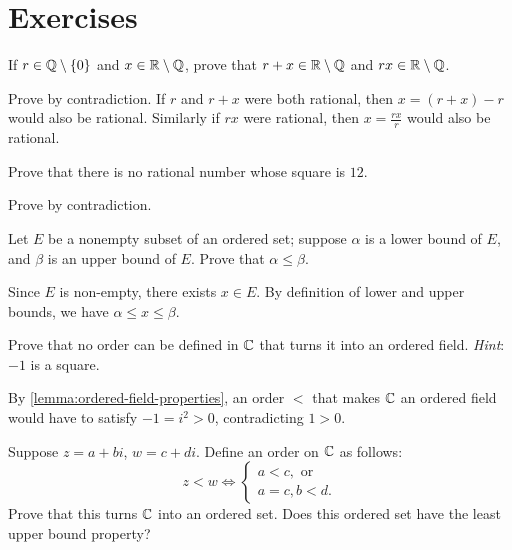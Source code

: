 \section*{Exercises}
\begin{exercise}
If $r\in\mathbb Q\setminus\{0\}$ and $x\in\mathbb R\setminus\mathbb Q$, prove that $r+x\in\mathbb R\setminus\mathbb Q$ and $rx\in\mathbb R\setminus\mathbb Q$.
\end{exercise}

\begin{solution}
Prove by contradiction. If $r$ and $r+x$ were both rational, then $x=(r+x)-r$ would also be rational. Similarly if $rx$ were rational, then $x=\frac{rx}{r}$ would also be rational.
\end{solution}

\begin{exercise}
Prove that there is no rational number whose square is $12$.
\end{exercise}

\begin{solution}
Prove by contradiction.
\end{solution}

\begin{exercise}
Let $E$ be a nonempty subset of an ordered set; suppose $\alpha$ is a lower bound of $E$, and $\beta$ is an upper bound of $E$. Prove that $\alpha\le\beta$.
\end{exercise}

\begin{solution}
Since $E$ is non-empty, there exists $x\in E$. By definition of lower and upper bounds, we have $\alpha\le x\le\beta$.
\end{solution}

\begin{exercise}
Prove that no order can be defined in $\mathbb C$ that turns it into an ordered field. \emph{Hint}: $-1$ is a square.
\end{exercise}

\begin{solution}
By \ref{lemma:ordered-field-properties}, an order $<$ that makes $\mathbb C$ an ordered field would have to satisfy $-1=i^2>0$, contradicting $1>0$.
\end{solution}

\begin{exercise}
Suppose $z=a+bi$, $w=c+di$. Define an order on $\mathbb C$ as follows:
\[z<w\iff\begin{cases}
a<c,\text{ or}\\
a=c,b<d.
\end{cases}\]
Prove that this turns $\mathbb C$ into an ordered set. Does this ordered set have the least upper bound property?
\end{exercise}

